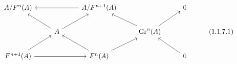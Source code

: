 \documentclass[crop,dvisvgm]{standalone}
\begin{document}
\[\begin {tikzcd}
        A/F^n(A)
        && A/ F^{n+1}(A)
          \ar [ll]
        && 0
      \\& A
          \ar [ul] \ar [ur]
        && \operatorname {Gr}^n(A)
          \ar [ul] \ar [ur]
        && (1.1.7.1)
      \\F^{n+1}(A)
          \ar [ur] \ar [rr]
        && F^n(A)
          \ar [ul] \ar [ur]
        && 0
          \ar [ul]
      \end {tikzcd}\]
\end{document}
